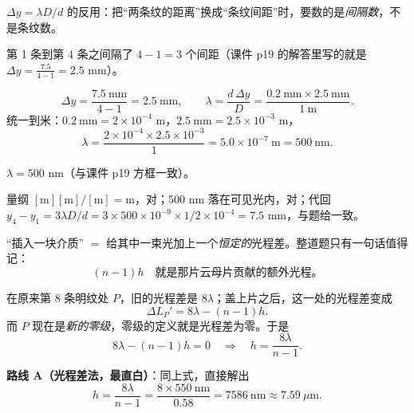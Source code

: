 \documentclass[11pt]{ctexart}
\begin{document}
\flowerrule
\qbreak
{}


$\Delta y=\lambda D/d$ 的反用：把“两条纹的距离”换成“条纹间距”时，要数的是\emph{间隔数}，不是条纹数。

第 1 条到第 4 条之间隔了 $4-1=3$ 个间距（课件 p19 的解答里写的就是 $\Delta y=\frac{7.5}{4-1}=2.5$ mm）。

\[
\Delta y=\frac{7.5\ \mathrm{mm}}{4-1}=2.5\ \mathrm{mm},
\qquad
\lambda=\frac{d\,\Delta y}{D}=\frac{0.2\ \mathrm{mm}\times2.5\ \mathrm{mm}}{1\ \mathrm{m}} .
\]
统一到米：$0.2\ \mathrm{mm}=2\times10^{-4}$ m，$2.5\ \mathrm{mm}=2.5\times10^{-3}$ m，
\[
\lambda=\frac{2\times10^{-4}\times2.5\times10^{-3}}{1}=5.0\times10^{-7}\ \mathrm{m}=500\ \mathrm{nm}.
\]

$\lambda=500$ nm（与课件 p19 方框一致）。

量纲 $[\mathrm{m}][\mathrm{m}]/[\mathrm{m}]=\mathrm{m}$，对；$500$ nm 落在可见光内，对；代回 $y_4-y_1=3\lambda D/d=3\times500\times10^{-9}\times1/2\times10^{-4}=7.5$ mm，与题给一致。

\flowerrule
\qbreak
{}


“插入一块介质” $=$ 给其中一束光加上一个\emph{恒定的}光程差。整道题只有一句话值得记：
\[
(n-1)h \quad\text{就是那片云母片贡献的额外光程。}
\]

在原来第 8 条明纹处 $P$，旧的光程差是 $8\lambda$；盖上片之后，这一处的光程差变成
\[
\Delta L_P'=8\lambda-(n-1)h .
\]
而 $P$ 现在是\emph{新的零级}，零级的定义就是光程差为零。于是
\[
8\lambda-(n-1)h=0\quad\Longrightarrow\quad h=\frac{8\lambda}{n-1}.
\]


\textbf{路线 A（光程差法，最直白）}：同上式，直接解出
\[
h=\frac{8\lambda}{n-1}=\frac{8\times550\ \mathrm{nm}}{0.58}=7586\ \mathrm{nm}\approx7.59\ \mu\mathrm{m}.
\]
\end{document}
